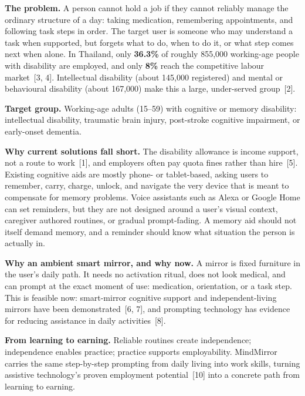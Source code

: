   \item {}

    \textbf{The problem.} A person cannot hold a job if they cannot reliably manage
    the ordinary structure of a day: taking medication, remembering appointments, and
    following task steps in order. The target user is someone who may understand a
    task when supported, but forgets what to do, when to do it, or what step comes
    next when alone. In Thailand, only
    \textbf{36.3\%} of roughly 855{,}000 working-age people with disability are
    employed, and only \textbf{8\%} reach the competitive labour market~[3, 4].
    Intellectual disability (about 145{,}000 registered) and mental or behavioural
    disability (about 167{,}000) make this a large, under-served group~[2].

    \textbf{Target group.} Working-age adults (15--59) with cognitive or memory
    disability: intellectual disability, traumatic brain injury, post-stroke
    cognitive impairment, or early-onset dementia.

    \textbf{Why current solutions fall short.} The disability allowance is income
    support, not a route to work~[1], and employers often pay quota fines rather than
    hire~[5]. Existing cognitive aids are mostly phone- or tablet-based, asking users
    to remember, carry, charge, unlock, and navigate the very device that is meant to
    compensate for memory problems. Voice assistants such as Alexa or Google Home can
    set reminders, but they are not designed around a user's visual context, caregiver
    authored routines, or gradual prompt-fading. A memory aid should not itself demand
    memory, and a reminder should know what situation the person is actually in.

    \textbf{Why an ambient smart mirror, and why now.} A mirror is fixed furniture in
    the user's daily path. It needs no activation ritual, does not look medical, and
    can prompt at the exact moment of use: medication, orientation, or a task step.
    This is feasible now: smart-mirror cognitive support and independent-living mirrors
    have been demonstrated~[6, 7], and prompting technology has evidence for reducing
    assistance in daily activities~[8].

    \textbf{From learning to earning.} Reliable routines create independence;
    independence enables practice; practice supports employability. MindMirror carries
    the same step-by-step prompting from daily living into work skills, turning
    assistive technology's proven employment potential~[10] into a concrete path from
    learning to earning.
